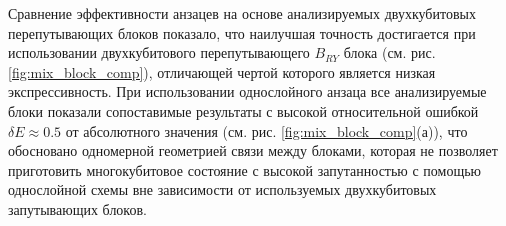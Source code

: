 \documentclass[14pt]{extarticle}
\begin{document}
\qquad Сравнение эффективности анзацев на основе анализируемых двухкубитовых перепутывающих блоков показало, что наилучшая точность достигается при использовании двухкубитового перепутывающего $B_{RY}$ блока (см. рис. \ref{fig:mix_block_comp}), отличающей чертой которого является низкая экспрессивность. При использовании однослойного анзаца все анализируемые блоки показали сопоставимые результаты с высокой относительной ошибкой $\delta E \approx 0.5$ от абсолютного значения (см. рис. \ref{fig:mix_block_comp}(а)), что обосновано одномерной геометрией связи между блоками, которая не позволяет приготовить многокубитовое состояние с высокой запутанностью с помощью однослойной схемы вне зависимости от используемых двухкубитовых запутывающих блоков.

\begin{figure}[H]
\begin{minipage}[H]{0.49\linewidth}
\end{minipage}
\hfill
\begin{minipage}[H]{0.49\linewidth}

\end{minipage}
\end{figure}
\end{document}
